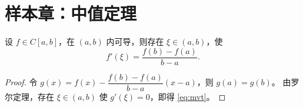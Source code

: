 \section{样本章：中值定理}

\begin{theorem}[拉格朗日中值定理]\label{thm:mvt}
设 $f\in C[a,b]$，在 $(a,b)$ 内可导，则存在 $\xi\in(a,b)$，使
\begin{equation}
  f'(\xi)=\frac{f(b)-f(a)}{b-a}.
  \label{eq:mvt}
\end{equation}
\end{theorem}

\begin{proof}
令 $g(x)=f(x)-\dfrac{f(b)-f(a)}{b-a}(x-a)$，则 $g(a)=g(b)$。
由罗尔定理，存在 $\xi\in(a,b)$ 使 $g'(\xi)=0$，即得 \eqref{eq:mvt}。
\end{proof}
